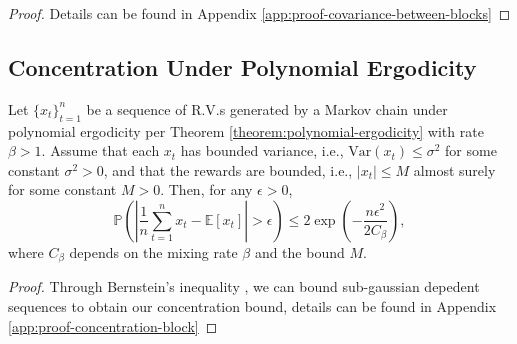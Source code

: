 \begin{proof}
Details can be found in Appendix \ref{app:proof-covariance-between-blocks}
\end{proof}

\subsection{Concentration Under Polynomial Ergodicity}

\begin{lemma}
\label{theorem:concentration-block}
Let \(\{x_t\}_{t=1}^n\) be a sequence of R.V.s generated by a Markov chain under polynomial ergodicity per Theorem \ref{theorem:polynomial-ergodicity} with rate \(\beta > 1\). Assume that each \(x_t\) has bounded variance, i.e., \(\text{Var}(x_t) \leq \sigma^2\) for some constant \(\sigma^2 > 0\), and that the rewards are bounded, i.e., \(|x_t| \leq M\) almost surely for some constant \(M > 0\). Then, for any \(\epsilon > 0\),
\[
\mathbb{P}\left(\left|\frac{1}{n}\sum_{t=1}^n x_t - \mathbb{E}[x_t]\right| > \epsilon\right) \leq 2\exp\left(-\frac{n\epsilon^2}{2C_\beta}\right),
\]
where \(C_\beta\) depends on the mixing rate \(\beta\) and the bound \(M\).
\end{lemma}

\begin{proof}
Through Bernstein's inequality  \cite{vershynin2018high}, we can bound sub-gaussian depedent sequences to obtain our concentration bound, details  can be found in Appendix \ref{app:proof-concentration-block}
\end{proof}